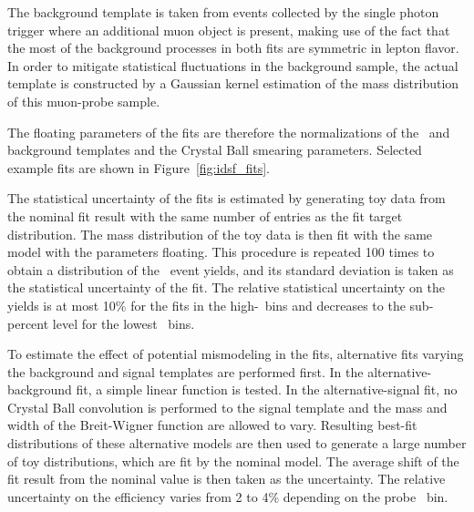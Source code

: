 The background template is taken from events collected by the single photon trigger where an additional muon object is present, making use of the fact that the most of the background processes in both fits are symmetric in lepton flavor. 
In order to mitigate statistical fluctuations in the background sample, the actual template is constructed by a Gaussian kernel estimation of the mass distribution of this muon-probe sample. %

The floating parameters of the fits are therefore the normalizations of the \Zee\ and background templates and the Crystal Ball smearing parameters. 
Selected example fits are shown in Figure~\ref{fig:idsf_fits}.

The statistical uncertainty of the fits is estimated by generating toy data from the nominal fit result with the same number of entries as the fit target distribution. 
The mass distribution of the toy data is then fit with the same model with the parameters floating. 
This procedure is repeated 100 times to obtain a distribution of the \Zee\ event yields, and its standard deviation is taken as the statistical uncertainty of the fit. 
The relative statistical uncertainty on the yields is at most 10\% for the fits in the high-\pt\ bins and decreases to the sub-percent level for the lowest \pt\ bins. %

To estimate the effect of potential mismodeling in the fits, alternative fits varying the background and signal templates are performed first. 
In the alternative-background fit, a simple linear function is tested.
In the alternative-signal fit, no Crystal Ball convolution is performed to the signal template and the mass and width of the Breit-Wigner function are allowed to vary. 
Resulting best-fit distributions of these alternative models are then used to generate a large number of toy distributions, which are fit by the nominal model. 
The average shift of the fit result from the nominal value is then taken as the uncertainty.
The relative uncertainty on the efficiency varies from 2 to 4\% depending on the probe \pt\ bin. %

